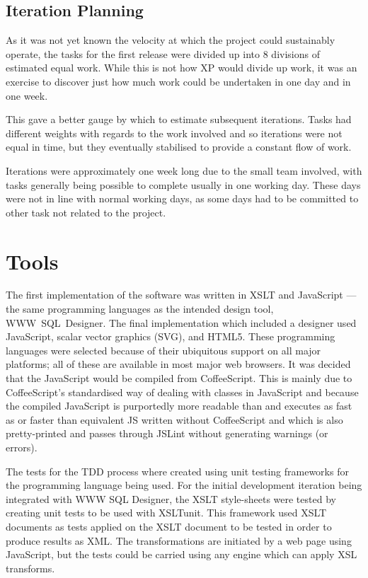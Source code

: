 \subsection{Iteration Planning}
As it was not yet known the velocity at which the project could sustainably operate, the tasks for the first release were divided up into 8 divisions of estimated equal work. While this is not how XP would divide up work, it was an exercise to discover just how much work could be undertaken in one day and in one week.

This gave a better gauge by which to estimate subsequent iterations. Tasks had different weights with regards to the work involved and so iterations were not equal in time, but they eventually stabilised to provide a constant flow of work.

Iterations were approximately one week long due to the small team involved, with tasks generally being possible to complete usually in one working day. These days were not in line with normal working days, as some days had to be committed to other task not related to the project.

\section{Tools}
The first implementation of the software was written in XSLT and JavaScript --- the same programming languages as the intended design tool, \mbox{WWW SQL Designer}. The final implementation which included a designer used JavaScript, scalar vector graphics (SVG), and HTML5. These programming languages were selected because of their ubiquitous support on all major platforms; all of these are available in most major web browsers. It was decided that the Java\-Script would be compiled from Coffee\-Script. This is mainly due to Coffee\-Script's standardised way of dealing with classes in Java\-Script and because the compiled Java\-Script is purportedly more readable than and executes as fast as or faster than equivalent JS written without Coffee\-Script and which is also pretty-printed and passes through JSLint without generating warnings (or errors).

The tests for the TDD process where created using unit testing frameworks for the programming language being used. For the initial development iteration being integrated with WWW SQL Designer, the XSLT style-sheets were tested by creating unit tests to be used with XSLTunit. This framework used XSLT documents as tests applied on the XSLT document to be tested in order to produce results as XML. The transformations are initiated by a web page using Java\-Script, but the tests could be carried using any engine which can apply XSL transforms.

